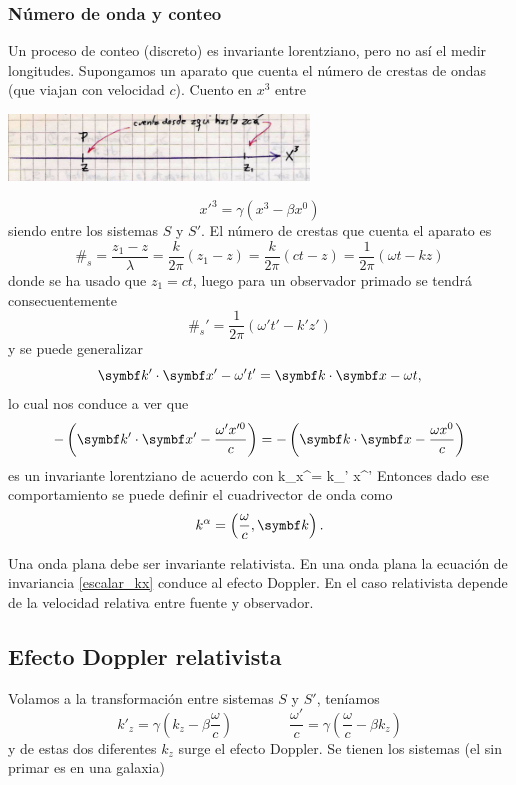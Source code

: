 \documentclass[10pt,oneside]{CBFT_book}
\begin{document}
\subsubsection{Número de onda y conteo}

Un proceso de conteo (discreto) es invariante lorentziano, pero no así el medir
longitudes.
Supongamos un aparato que cuenta el número de crestas de ondas (que viajan con velocidad
$c$).
Cuento en $x^3$ entre

\includegraphics[width=0.6\textwidth]{images/fig_ft1_sr_ondas.jpg}

\[
	x'^3 = \gamma ( x^3 - \beta x^0 )
\]
siendo  entre los sistemas $S$ y $S'$.
El número de crestas que cuenta el aparato es 
\[
	\#_s = \frac{ z_1 - z }{ \lambda } = \frac{ k }{ 2\pi }( z_1 - z ) = \frac{ k }{ 2\pi }( ct - z ) = 
	\frac{ 1 }{ 2\pi }( \omega t - kz )
\]
donde se ha usado que $z_1 = ct $, luego para un observador primado se tendrá consecuentemente
\[
	\#_s' = \frac{ 1 }{ 2\pi }( \omega' t' - k'z' )
\]
y se puede generalizar
\[
	\pe{k'}{x'} - \omega' t' = \pe{k}{x} - \omega t,
\]
lo cual nos conduce a ver que
\[
	-\left( \pe{k'}{x'} - \frac{\omega' x'^0 }{c} \right) = 
	-\left( \pe{k}{x} - \frac{\omega x^0 }{c}  \right)
\]
es un invariante lorentziano de acuerdo con
\be
	k_\alpha x^\alpha = k_{\alpha}' x^{'\alpha}
	\label{escalar_kx}
\ee
Entonces dado ese comportamiento se puede definir el cuadrivector de onda como
\[
	k^\alpha = \left( \frac{\omega}{c}, \vb{k}\right).
\]

Una onda plana debe ser invariante relativista. En una onda plana la ecuación de invariancia
\eqref{escalar_kx} conduce al efecto Doppler. En el caso relativista depende de la velocidad
relativa entre fuente y observador.

\subsection{Efecto Doppler relativista}

Volamos a la transformación entre sistemas $S$ y $S'$, teníamos
\[
	k'_z = \gamma \left( k_z - \beta \frac{\omega}{c} \right) \qquad \qquad 
	\frac{\omega'}{c}  = \gamma \left( \frac{\omega}{c} - \beta k_z \right)
\]
y de estas dos diferentes $k_z$ surge el efecto Doppler.
Se tienen los sistemas (el sin primar es en una galaxia)
\end{document}
